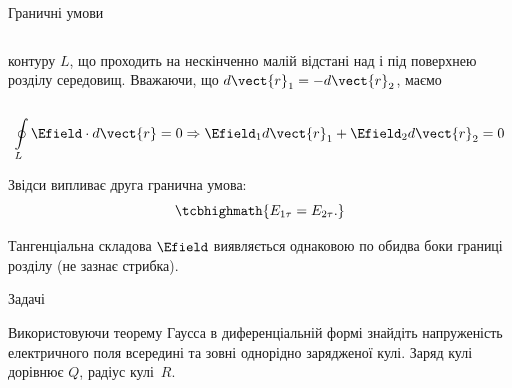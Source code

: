 \documentclass{beamer}
\begin{document}
\begin{frame}{Граничні умови}{}
\begin{onlyenv}
\begin{columns}
\begin{column}{0.6\linewidth}
\begin{block}{}
					контуру $L$, що проходить на нескінченно малій відстані над і під поверхнею
					розділу середовищ. Вважаючи, що $d\vect{r}_1 = -d\vect{r}_2$, маємо
				\end{block}
			\end{column}
			\begin{column}{0.4\linewidth}\centering
				
			\end{column}
		\end{columns}
		\begin{block}{}\scriptsize
			\begin{equation*}
				\oint\limits_L \Efield\cdot d\vect{r} = 0 \Rightarrow \Efield_1 d\vect{r}_1 +
				\Efield_2 d\vect{r}_2 = 0
			\end{equation*}
		\end{block}
		\begin{block}{}
			Звідси випливає друга гранична умова:
			\begin{equation*}
				\tcbhighmath{
					E_{1\tau} = E_{2\tau}.
				}
			\end{equation*}
		\end{block}
		\begin{alertblock}{}\justifying\scriptsize
			Тангенціальна складова $\Efield$ виявляється однаковою по обидва боки границі розділу (не
			зазнає стрибка).
		\end{alertblock}
	\end{onlyenv}
\end{frame}



\begin{frame}{Задачі}{}
	\begin{exampleblock}{}
		Використовуючи теорему Гаусса в диференціальній формі знайдіть напруженість
		електричного поля всередині та зовні однорідно зарядженої кулі. Заряд кулі дорівнює
		$Q$, радіус кулі~$R$.
	\end{exampleblock}
\end{frame}
\end{document}

